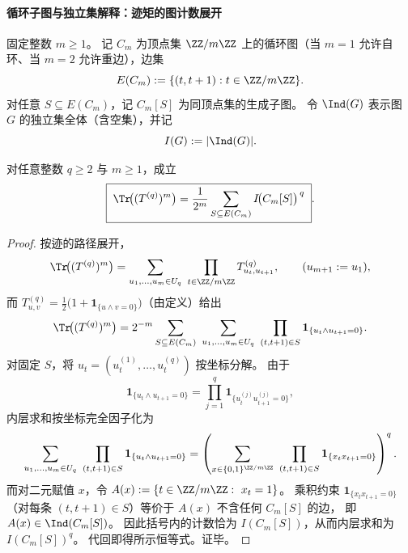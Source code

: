 \paragraph{循环子图与独立集解释：迹矩的图计数展开}
固定整数 \(m\ge 1\)。
记 \(C_m\) 为顶点集 \(\ZZ/m\ZZ\) 上的循环图（当 \(m=1\) 允许自环、当 \(m=2\) 允许重边），边集
\[
E(C_m):=\{(t,t+1):t\in\ZZ/m\ZZ\}.
\]
对任意 \(S\subseteq E(C_m)\)，记 \(C_m[S]\) 为同顶点集的生成子图。
令 \(\Ind(G)\) 表示图 \(G\) 的独立集全体（含空集），并记
\[
I(G):=|\Ind(G)|.
\]

\begin{conclusion}[全阶迹矩的循环子图独立集展开]\label{con:xi-terminal-replica-softcore-trace-moment-cycle-subgraph-independent-sets}
对任意整数 \(q\ge 2\) 与 \(m\ge 1\)，成立
\[
\boxed{\;
\Tr\!\bigl((T^{(q)})^m\bigr)
=\frac1{2^m}\sum_{S\subseteq E(C_m)} I\!\bigl(C_m[S]\bigr)^{\,q}\; } .
\]
\end{conclusion}
\begin{proof}
按迹的路径展开，
\[
\Tr\!\bigl((T^{(q)})^m\bigr)
=\sum_{u_1,\dots,u_m\in U_q}\ \prod_{t\in\ZZ/m\ZZ}T^{(q)}_{u_t,u_{t+1}},
\qquad (u_{m+1}:=u_1),
\]
而 \(T^{(q)}_{u,v}=\frac12\bigl(1+\mathbf{1}_{\{u\wedge v=0\}}\bigr)\)（由定义）给出
\[
\Tr\!\bigl((T^{(q)})^m\bigr)
=2^{-m}\sum_{S\subseteq E(C_m)}\ \sum_{u_1,\dots,u_m\in U_q}\ \prod_{(t,t+1)\in S}\mathbf{1}_{\{u_t\wedge u_{t+1}=0\}}.
\]
对固定 \(S\)，将 \(u_t=(u_t^{(1)},\dots,u_t^{(q)})\) 按坐标分解。
由于
\[
\mathbf{1}_{\{u_t\wedge u_{t+1}=0\}}=\prod_{j=1}^{q}\mathbf{1}_{\{u_t^{(j)}u_{t+1}^{(j)}=0\}},
\]
内层求和按坐标完全因子化为
\[
\sum_{u_1,\dots,u_m\in U_q}\ \prod_{(t,t+1)\in S}\mathbf{1}_{\{u_t\wedge u_{t+1}=0\}}
=\left(\sum_{x\in\{0,1\}^{\ZZ/m\ZZ}}\ \prod_{(t,t+1)\in S}\mathbf{1}_{\{x_t x_{t+1}=0\}}\right)^{q}.
\]
而对二元赋值 \(x\)，令 \(A(x):=\{t\in\ZZ/m\ZZ:\ x_t=1\}\)。
乘积约束 \(\mathbf{1}_{\{x_t x_{t+1}=0\}}\)（对每条 \((t,t+1)\in S\)）等价于 \(A(x)\) 不含任何 \(C_m[S]\) 的边，
即 \(A(x)\in\Ind(C_m[S])\)。
因此括号内的计数恰为 \(I(C_m[S])\)，从而内层求和为 \(I(C_m[S])^{q}\)。
代回即得所示恒等式。证毕。
\end{proof}

